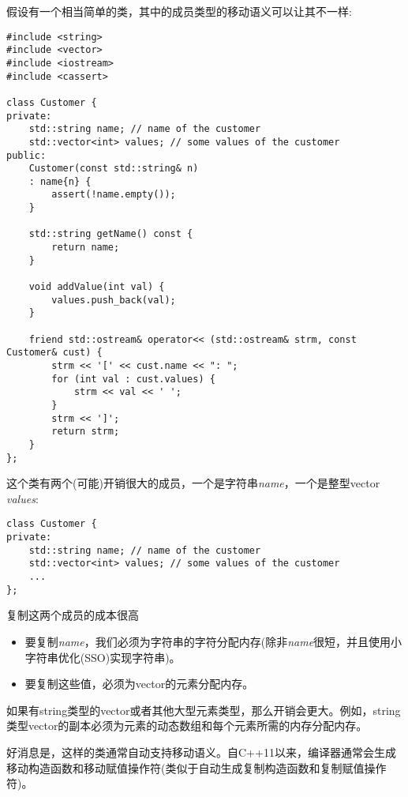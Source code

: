 假设有一个相当简单的类，其中的成员类型的移动语义可以让其不一样:\par

{\color{red}{basics/customer.hpp}}

\begin{lstlisting}[caption={}]
#include <string>
#include <vector>
#include <iostream>
#include <cassert>

class Customer {
private:
	std::string name; // name of the customer
	std::vector<int> values; // some values of the customer
public:
	Customer(const std::string& n)
	: name{n} {
		assert(!name.empty());
	}

	std::string getName() const {
		return name;
	}

	void addValue(int val) {
		values.push_back(val);
	}

	friend std::ostream& operator<< (std::ostream& strm, const Customer& cust) {
		strm << '[' << cust.name << ": ";
		for (int val : cust.values) {
			strm << val << ' ';
		}
		strm << ']';
		return strm;
	}
};
\end{lstlisting}

这个类有两个(可能)开销很大的成员，一个是字符串\textit{name}，一个是整型vector \textit{values}:\par

\begin{lstlisting}[caption={}]
class Customer {
private:
	std::string name; // name of the customer
	std::vector<int> values; // some values of the customer
	...
};
\end{lstlisting}

复制这两个成员的成本很高\par

\begin{itemize}
	\item 要复制\textit{name}，我们必须为字符串的字符分配内存(除非\textit{name}很短，并且使用小字符串优化(SSO)实现字符串)。
	\item 要复制这些值，必须为vector的元素分配内存。
\end{itemize}

如果有string类型的vector或者其他大型元素类型，那么开销会更大。例如，string类型vector的副本必须为元素的动态数组和每个元素所需的内存分配内存。\par

好消息是，这样的类通常自动支持移动语义。自C++11以来，编译器通常会生成移动构造函数和移动赋值操作符(类似于自动生成复制构造函数和复制赋值操作符)。\par

